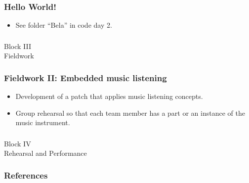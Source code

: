 \documentclass[screen, aspectratio=169]{beamer}
\begin{document}
%
\begin{frame}
  \frametitle{Hello World!}
       \begin{itemize}
     \item See folder ``Bela'' in code day 2.
     \end{itemize}
\end{frame}
%
%
\usebackgroundtemplate{}
\begin{frame}
\frametitle{}
{\huge Block III\\Fieldwork}
\end{frame}
%
\begin{frame}
  \frametitle{Fieldwork II: Embedded music listening}
        \begin{itemize}
	\item Development of a patch that applies music listening concepts.
	\item Group rehearsal so that each team member has a part or an instance of the music instrument.
    \end{itemize} 
\end{frame}
%
\usebackgroundtemplate{}
\begin{frame}
\frametitle{}
{\huge Block IV\\Rehearsal and Performance}
\end{frame}
\begin{frame}
  \frametitle{References}
  \printbibliography
\end{frame}
\end{document}
